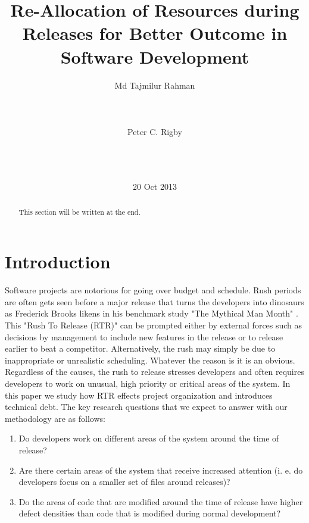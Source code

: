 \documentclass{acm_proc_article-sp}
\begin{document}
\title{Re-Allocation of Resources during Releases for Better Outcome in Software Development }
\author{
\alignauthor
Md Tajmilur Rahman\\
       \\
       \\
       \\
\alignauthor
Peter C. Rigby\\
       \\
       \\
       \\
}
\date{20 Oct 2013}
\maketitle
\begin{abstract}
This section will be written at the end.
\end{abstract}
\section{Introduction}
Software projects are notorious for going over budget and schedule. Rush periods are often gets seen before a major release that turns the developers into dinosaurs as Frederick Brooks likens in his benchmark study "The Mythical Man Month" \cite{brooks:mythical}. This "Rush To Release (RTR)" can be prompted either by external forces such as decisions by management to include new features in the release or to release earlier to beat a competitor. Alternatively, the rush may simply be due to inappropriate or unrealistic scheduling. Whatever the reason is it is an obvious. Regardless of the causes, the rush to release stresses developers and often requires developers to work on unusual, high priority or critical areas of the system. In this paper we study how RTR effects project organization and introduces technical debt. The key research questions that we expect to answer with our methodology are as follows:
\begin{enumerate}
\item Do developers work on different areas of the system around the time of release?
\item Are there certain areas of the system that receive increased attention (i. e. do developers focus on a smaller set of files around releases)?
\item Do the areas of code that are modified around the time of release have higher defect densities than code that is modified during normal development?
\end{enumerate}
\end{document}
